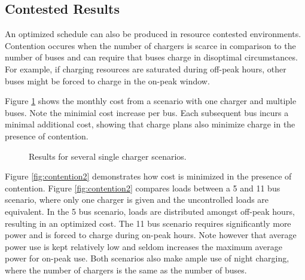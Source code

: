 \subsection{Contested Results}
An optimized schedule can also be produced in resource contested environments. Contention occures when the number of chargers is scarce in comparison to the number of buses and can require that buses charge in disoptimal circumstances.  For example, if charging resources are saturated during off-peak hours, other buses might be forced to charge in the on-peak window. 
\par Figure \ref{fig:contention1} shows the monthly cost from a scenario with one charger and multiple buses. Note the minimial cost increase per bus.  Each subsequent bus incurs a minimal additional cost, showing that charge plans also minimize charge in the presence of contention.
\begin{figure}
	\caption{Results for several single charger scenarios.}
	\label{fig:contention1}
\end{figure}
\par Figure \ref{fig:contention2} demonstrates how cost is minimized in the presence of contention. Figure \ref{fig:contention2} compares loads between a 5 and 11 bus scenario, where only one charger is given and the uncontrolled loads are equivalent. In the 5 bus scenario, loads are distributed amongst off-peak hours, resulting in an optimized cost.  The 11 bus scenario requires significantly more power and is forced to charge during on-peak hours.  Note however that average power use is kept relatively low and seldom increases the maximum average power for on-peak use. Both scenarios also make ample use of night charging, where the number of chargers is the same as the number of buses.  
\begin{figure*}
	\centering
	\caption{Comparison of the loads for a 5 and 11 bus scenario with one overhead charger} 
	\label{fig:contention2}
\end{figure*}

